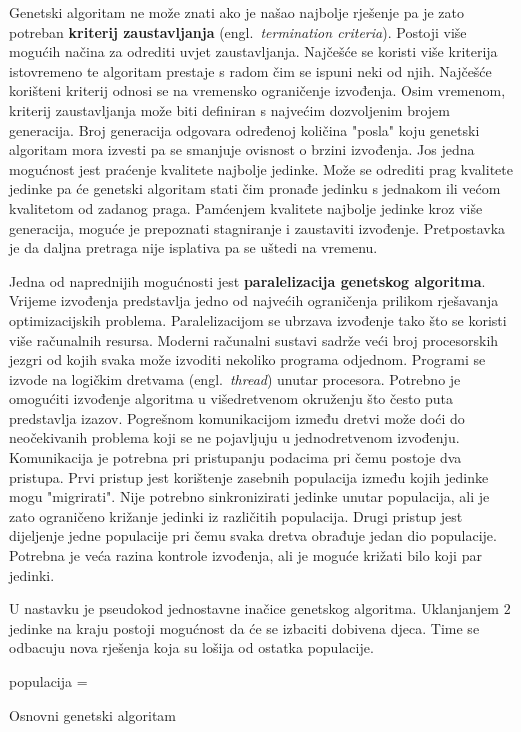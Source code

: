 \documentclass[times, utf8, diplomski]{fer}
\begin{document}
Genetski algoritam ne može znati ako je našao najbolje rješenje pa je zato potreban \textbf{kriterij zaustavljanja} (engl.~\textit{termination criteria}). Postoji više mogućih načina za odrediti uvjet zaustavljanja. Najčešće se koristi više kriterija istovremeno te algoritam prestaje s radom čim se ispuni neki od njih. Najčešće korišteni kriterij odnosi se na vremensko ograničenje izvođenja. Osim vremenom, kriterij zaustavljanja može biti definiran s najvećim dozvoljenim brojem generacija. Broj generacija odgovara određenoj količina "posla" koju genetski algoritam mora izvesti pa se smanjuje ovisnost o brzini izvođenja. Jos jedna mogućnost jest praćenje kvalitete najbolje jedinke. Može se odrediti prag kvalitete jedinke pa će genetski algoritam stati čim pronađe jedinku s jednakom ili većom kvalitetom od zadanog praga. Pamćenjem kvalitete najbolje jedinke kroz više generacija, moguće je prepoznati stagniranje i zaustaviti izvođenje. Pretpostavka je da daljna pretraga nije isplativa pa se uštedi na vremenu.

Jedna od naprednijih mogućnosti jest \textbf{paralelizacija genetskog algoritma}. Vrijeme izvođenja predstavlja jedno od najvećih ograničenja prilikom rješavanja optimizacijskih problema. Paralelizacijom se ubrzava izvođenje tako što se koristi više računalnih resursa. Moderni računalni sustavi sadrže veći broj procesorskih jezgri od kojih svaka može izvoditi nekoliko programa odjednom. Programi se izvode na logičkim dretvama (engl.~\textit{thread}) unutar procesora. Potrebno je omogućiti izvođenje algoritma u višedretvenom okruženju što često puta predstavlja izazov. Pogrešnom komunikacijom između dretvi može doći do neočekivanih problema koji se ne pojavljuju u jednodretvenom izvođenju. Komunikacija je potrebna pri pristupanju podacima pri čemu postoje dva pristupa. Prvi pristup jest korištenje zasebnih populacija između kojih jedinke mogu "migrirati". Nije potrebno sinkronizirati jedinke unutar populacija, ali je zato ograničeno križanje jedinki iz različitih populacija. Drugi pristup jest dijeljenje jedne populacije pri čemu svaka dretva obrađuje jedan dio populacije. Potrebna je veća razina kontrole izvođenja, ali je moguće križati bilo koji par jedinki.

U nastavku je pseudokod jednostavne inačice genetskog algoritma. Uklanjanjem $2$ jedinke na kraju postoji mogućnost da će se izbaciti dobivena djeca. Time se odbacuju nova rješenja koja su lošija od ostatka populacije.

\begin{algorithm}
	{
		populacija = \init{}\;
		\;
	}
	\caption{Osnovni genetski algoritam}
\end{algorithm}
\end{document}
